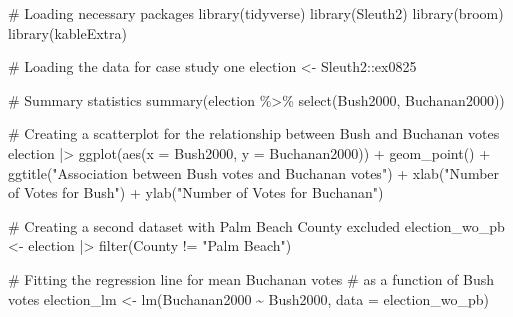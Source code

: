 \documentclass[
  letterpaper,
  DIV=11,
  numbers=noendperiod]{scrartcl}
\newenvironment{Shaded}{\begin{snugshade}}{\end{snugshade}}
\newcommand{\AttributeTok}[1]{\textcolor[rgb]{0.40,0.45,0.13}{#1}}
\newcommand{\CommentTok}[1]{\textcolor[rgb]{0.37,0.37,0.37}{#1}}
\newcommand{\FunctionTok}[1]{\textcolor[rgb]{0.28,0.35,0.67}{#1}}
\newcommand{\NormalTok}[1]{\textcolor[rgb]{0.00,0.23,0.31}{#1}}
\newcommand{\OtherTok}[1]{\textcolor[rgb]{0.00,0.23,0.31}{#1}}
\newcommand{\SpecialCharTok}[1]{\textcolor[rgb]{0.37,0.37,0.37}{#1}}
\newcommand{\StringTok}[1]{\textcolor[rgb]{0.13,0.47,0.30}{#1}}
\begin{document}
\begin{Shaded}
\begin{Highlighting}[]
\CommentTok{\# Loading necessary packages}
\FunctionTok{library}\NormalTok{(tidyverse)}
\FunctionTok{library}\NormalTok{(Sleuth2)}
\FunctionTok{library}\NormalTok{(broom)        }
\FunctionTok{library}\NormalTok{(kableExtra)   }

\CommentTok{\# Loading the data for case study one}
\NormalTok{election }\OtherTok{\textless{}{-}}\NormalTok{ Sleuth2}\SpecialCharTok{::}\NormalTok{ex0825}

\CommentTok{\# Summary statistics}
\FunctionTok{summary}\NormalTok{(election }\SpecialCharTok{\%\textgreater{}\%} \FunctionTok{select}\NormalTok{(Bush2000, Buchanan2000))}

\CommentTok{\# Creating a scatterplot for the relationship between Bush and Buchanan votes}
\NormalTok{election }\SpecialCharTok{|\textgreater{}}
  \FunctionTok{ggplot}\NormalTok{(}\FunctionTok{aes}\NormalTok{(}\AttributeTok{x =}\NormalTok{ Bush2000,}
             \AttributeTok{y =}\NormalTok{ Buchanan2000)) }\SpecialCharTok{+}
  \FunctionTok{geom\_point}\NormalTok{() }\SpecialCharTok{+}
  \FunctionTok{ggtitle}\NormalTok{(}\StringTok{"Association between Bush votes and Buchanan votes"}\NormalTok{) }\SpecialCharTok{+}
  \FunctionTok{xlab}\NormalTok{(}\StringTok{"Number of Votes for Bush"}\NormalTok{) }\SpecialCharTok{+} \FunctionTok{ylab}\NormalTok{(}\StringTok{"Number of Votes for Buchanan"}\NormalTok{)}

\CommentTok{\# Creating a second dataset with Palm Beach County excluded}
\NormalTok{election\_wo\_pb }\OtherTok{\textless{}{-}}\NormalTok{ election }\SpecialCharTok{|\textgreater{}}
  \FunctionTok{filter}\NormalTok{(County }\SpecialCharTok{!=} \StringTok{"Palm Beach"}\NormalTok{)}

\CommentTok{\# Fitting the regression line for mean Buchanan votes }
\CommentTok{\# as a function of Bush votes}
\NormalTok{election\_lm }\OtherTok{\textless{}{-}} \FunctionTok{lm}\NormalTok{(Buchanan2000 }\SpecialCharTok{\textasciitilde{}}\NormalTok{ Bush2000, }\AttributeTok{data =}\NormalTok{ election\_wo\_pb)}



\end{Highlighting}
\end{Shaded}
\end{document}
